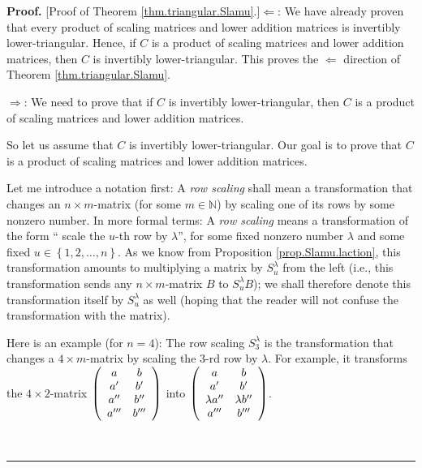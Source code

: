 \documentclass[numbers=enddot,12pt,final,onecolumn,notitlepage]{scrartcl}%
\theoremstyle{definition}
\newenvironment{proof}[1][Proof]{\noindent\textbf{#1.} }{\ \rule{0.5em}{0.5em}}
\begin{document}
\begin{proof}
[Proof of Theorem \ref{thm.triangular.Slamu}.]$\Longleftarrow$: We have
already proven that every product of scaling matrices and lower addition
matrices is invertibly lower-triangular. Hence, if $C$ is a product of scaling
matrices and lower addition matrices, then $C$ is invertibly lower-triangular.
This proves the $\Longleftarrow$ direction of Theorem
\ref{thm.triangular.Slamu}.

$\Longrightarrow$: We need to prove that if $C$ is invertibly
lower-triangular, then $C$ is a product of scaling matrices and lower addition matrices.

So let us assume that $C$ is invertibly lower-triangular. Our goal is to prove
that $C$ is a product of scaling matrices and lower addition matrices.

Let me introduce a notation first: A \textit{row scaling} shall mean a
transformation that changes an $n\times m$-matrix (for some $m\in\mathbb{N}$)
by scaling one of its rows by some nonzero number. In more formal terms: A
\textit{row scaling} means a transformation of the form \textquotedblleft
scale the $u$-th row by $\lambda$\textquotedblright, for some fixed nonzero
number $\lambda$ and some fixed $u\in\left\{  1,2,\ldots,n\right\}  $. As we
know from Proposition \ref{prop.Slamu.laction}, this transformation amounts to
multiplying a matrix by $S_{u}^{\lambda}$ from the left (i.e., this
transformation sends any $n\times m$-matrix $B$ to $S_{u}^{\lambda}B$); we
shall therefore denote this transformation itself by $S_{u}^{\lambda}$ as well
(hoping that the reader will not confuse the transformation with the matrix).

Here is an example (for $n=4$): The row scaling $S_{3}^{\lambda}$ is the
transformation that changes a $4\times m$-matrix by scaling the $3$-rd row by
$\lambda$. For example, it transforms the $4\times2$-matrix $\left(
\begin{array}
[c]{cc}%
a & b\\
a^{\prime} & b^{\prime}\\
a^{\prime\prime} & b^{\prime\prime}\\
a^{\prime\prime\prime} & b^{\prime\prime\prime}%
\end{array}
\right)  $ into $\left(
\begin{array}
[c]{cc}%
a & b\\
a^{\prime} & b^{\prime}\\
\lambda a^{\prime\prime} & \lambda b^{\prime\prime}\\
a^{\prime\prime\prime} & b^{\prime\prime\prime}%
\end{array}
\right)  $.


\end{proof}
\end{document}
